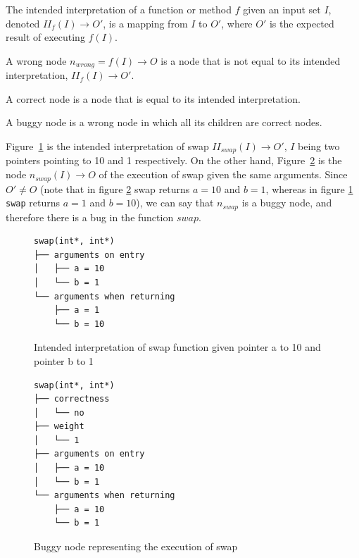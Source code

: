 \begin{definition}
The intended interpretation of a function or method \(f\) given an input set \(I\), denoted \(II_f(I) \to O'\), is a mapping from \(I\) to \(O'\), where \(O'\) is the expected result of executing \(f(I)\).
\end{definition}
\begin{definition}
A wrong node \(n_{wrong} = f(I) \to O\) is a node that is not equal to its intended interpretation, \(II_f(I) \to O'\).
\end{definition}
\begin{definition}
A correct node is a node that is equal to its intended interpretation.
\end{definition}
\begin{definition}
A buggy node is a wrong node in which all its children are correct nodes. 
\end{definition}
\theoremstyle{definition}
\begin{exmp}
Figure~\ref{fig:intendedInterpretationSwap} is the intended interpretation of swap \(II_{swap}(I) \to O'\), \(I\) being two pointers pointing to 10 and 1 respectively.
On the other hand, Figure~\ref{fig:buggySwap} is the node \(n_{swap}(I) \to O\) of the execution of swap given the same arguments.
Since \(O'\neq O\) (note that in figure \ref{fig:buggySwap} swap returns \(a = 10\) and \(b = 1\), whereas in figure  \ref{fig:intendedInterpretationSwap} \texttt{swap} returns \(a = 1\) and \(b = 10\)), we can say that \(n_{swap}\) is a buggy node, and therefore there is a bug in the function \(swap\).

\begin{figure}[h]
\caption{Intended interpretation of swap function given pointer a to 10 and pointer b to 1}
\label{fig:intendedInterpretationSwap}
\begin{verbatim}
swap(int*, int*)
├── arguments on entry
│   ├── a = 10
│   └── b = 1
└── arguments when returning
    ├── a = 1
    └── b = 10
\end{verbatim}
\end{figure}

\begin{figure}[h]
\caption{Buggy node representing the execution of swap}
\label{fig:buggySwap}
\begin{verbatim}
swap(int*, int*)
├── correctness
│   └── no
├── weight
│   └── 1
├── arguments on entry
│   ├── a = 10
│   └── b = 1
└── arguments when returning
    ├── a = 10
    └── b = 1
\end{verbatim}
\end{figure}

\end{exmp}

